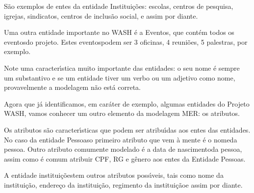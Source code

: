 \documentclass[
12pt,		%
openright,	%
twoside,  %
a4paper,			%
chapter=TITLE,		%
english,			%
french,				%
spanish,			%
brazil				%
]{USPSC-classe/USPSC_RedarTex}
\begin{document}
S\~ao exemplos de entes da entidade \textquotedbl Institui\c{c}\~oes\textquotedbl : escolas, centros de pesquisa, igrejas, sindicatos, centros de inclus\~ao social, e assim por diante.








Uma outra entidade importante no WASH \'e a \textquotedbl Eventos\textquotedbl , que cont\'em todos os \textquotedbl eventos\textquotedbl  do projeto. Estes \textquotedbl eventos\textquotedbl  podem ser 3 oficinas, 4 reuni\~oes, 5 palestras, por exemplo.








Note uma caracter\'{\i}stica muito importante das entidades: o seu nome \'e sempre um substantivo e se um entidade tiver um verbo ou um adjetivo como nome, provavelmente a modelagem n\~ao est\'a correta.









\noindent\begin{center}\mbox{\centering{}}\end{center}


Agora que j\'a identificamos, em car\'ater de exemplo, algumas entidades do Projeto WASH, vamos conhecer um outro elemento da modelagem MER: os atributos.








Os atributos s\~ao caracter\'{\i}sticas que podem ser atribu\'{\i}das aos entes das entidades. No caso da entidade \textquotedbl Pessoas\textquotedbl  o primeiro atributo que vem \`a mente \'e o \textquotedbl nome\textquotedbl  da pessoa. Outro atributo comumente modelado \'e a \textquotedbl data de nascimento\textquotedbl  da pessoa, assim como \'e comum atribuir CPF, RG e g\^enero aos entes da Entidade \textquotedbl Pessoas\textquotedbl .








A entidade \textquotedbl institui\c{c}\~oes\textquotedbl  tem outros atributos poss\'{\i}veis, tais como \textquotedbl nome da institui\c{c}\~ao\textquotedbl , \textquotedbl endere\c{c}o da institui\c{c}\~ao\textquotedbl , \textquotedbl regimento da institui\c{c}\~ao\textquotedbl  e assim por diante.
\end{document}
